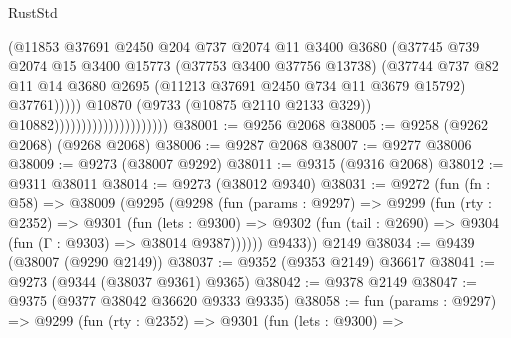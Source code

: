 \begin{lexlean}{RustStd}
\begin{coremodule}
{\begin{coremodule}
{{{{{{{{{{{{{{{{{{{{{{{{{{{{{{{{{{{{{{{{{{{{{{{{{{{{{{{                                                  (@11853
                                                    @37691
                                                    @2450
                                                    @204
                                                    @737
                                                    @2074
                                                    @11
                                                    @3400
                                                    @3680
                                                    (@37745
                                                      @739
                                                      @2074
                                                      @15
                                                      @3400
                                                      @15773
                                                      (@37753 @3400 @37756 @13738)
                                                      (@37744
                                                        @737
                                                        @82
                                                        @11
                                                        @14
                                                        @3680
                                                        @2695
                                                        (@11213 @37691 @2450 @734 @11 @3679 @15792)
                                                        @37761)))))
                                              @10870
                                              (@9733 (@10875 @2110 @2133 @329))
                                              @10882)))))))))))))))))))))
@38001 := @9256 @2068
@38005 := @9258 (@9262 @2068) (@9268 @2068)
@38006 := @9287 @2068
@38007 := @9277 @38006
@38009 := @9273 (@38007 @9292)
@38011 := @9315 (@9316 @2068)
@38012 := @9311 @38011
@38014 := @9273 (@38012 @9340)
@38031 := @9272
    (fun (fn : @58) =>
    @38009
      (@9295
        (@9298
          (fun (params : @9297) =>
          @9299
            (fun (rty : @2352) =>
            @9301
              (fun (lets : @9300) =>
              @9302 (fun (tail : @2690) => @9304 (fun (Γ : @9303) => @38014 @9387))))))
        @9433))
    @2149
@38034 := @9439 (@38007 (@9290 @2149))
@38037 := @9352 (@9353 @2149) @36617
@38041 := @9273 (@9344 (@38037 @9361) @9365)
@38042 := @9378 @2149
@38047 := @9375 (@9377 @38042 @36620 @9333 @9335)
@38058 := fun (params : @9297) =>
  @9299
    (fun (rty : @2352) =>
    @9301
      (fun (lets : @9300) =>
}}}}}}}}}}}}}}}}}}}}}}}}}}}}}}}}}}}}}}}}}}}}}}}}}}}}}}}
\end{coremodule}}
\end{coremodule}
\end{lexlean}
